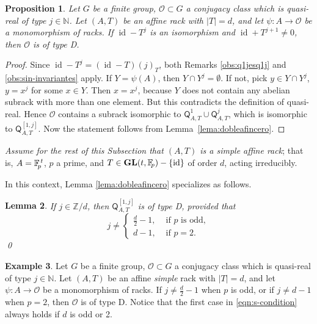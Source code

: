 \documentclass[11pt]{amsart} \textheight 22cm
\renewcommand{\^}[1]{\mbox{$^{\left( #1 \right)}$}}
\renewcommand{\_}[1]{\mbox{$_{\left( #1 \right)}$}}
\newcommand{\Z}{{\mathbb Z}}
\newcommand{\N}{{\mathbb N}}
\newcommand{\Q}{{\mathsf Q}}
\newcommand{\F}{{\mathbb F}}
\newcommand{\GL}{\mathbf{GL}}
\newcommand{\oc}{{\mathcal O}}
\theoremstyle{plain}
\newtheorem{lema}{Lemma}[section]
\newtheorem{prop}[lema]{Proposition}
\theoremstyle{definition}
\newtheorem{exa}[lema]{Example}
\theoremstyle{remark}
\newcommand\id{\operatorname{id}}
\def\pf{\begin{proof}}
\def\epf{\end{proof}}
\theoremstyle{remark}
\begin{document}
\begin{prop}\label{lema:dobleafin}
    Let $G$ be a finite group, $\oc\subset G$ a conjugacy class which is quasi-real of type
    $j\in\N$. Let $(A,T)$ be an affine rack with $\vert T\vert = d$, and let $\psi:A\to\oc$
    be a monomorphism of racks. If
    $\id-T^j$ is an isomorphism and $\id + T^{j+1} \neq 0$, then $\oc$ is of
    type D.
\end{prop}

\pf
Since $\id-T^j = (\id -T) (j)_T$, both Remarks \ref{obs:q1jesq1j}
and \ref{obs:sin-invariantes} apply. If $Y = \psi(A)$, then $Y\cap
Y^{j} = \emptyset$. If not, pick $y \in Y\cap Y^{j}$, $y = x^j$
for some $x\in Y$. Then $x = x^j$, because $Y$ does not contain
any abelian subrack with more than one element. But this
contradicts the definition of quasi-real. Hence $\oc$ contains a
subrack isomorphic to $\Q_{A,T}^1\cup\Q_{A,T}^j$, which is
isomorphic to $\Q_{A,T}^{[1,j]}$. Now the statement follows from
Lemma~\ref{lema:dobleafincero}. \epf

\emph{Assume for the rest of this Subsection that $(A,T)$ is a
simple affine rack}; that is, $A = \F_{\hspace{-2pt}p}^{\, t}$,
$p$ a prime, and $T\in \GL(t, \F_{\hspace{-2pt}p}) - \{\id\}$ of
order $d$, acting irreducibly.

In this context, Lemma \ref{lema:dobleafincero} specializes as
follows.

\begin{lema}\label{lema:dobleafin-simple}
      If $j\in \Z/d$, then $\Q_{A,T}^{[1,j]}$ is of type D, provided that
    \begin{equation}\label{eqn:s-condition}
j\neq\begin{cases} \frac{d}{2} - 1, &\text{ if $p$ is odd}, \\
d-1 , &\text{ if $p=2$}.
\end{cases}
    \end{equation}
\qed\end{lema}



\begin{exa}\label{exa:dp-tipoD}
Let $G$ be a finite group, $\oc\subset G$ a conjugacy class which
is quasi-real of type $j\in\N$. Let $(A,T)$ be an affine \emph{simple}
rack with $\vert T\vert = d$, and let $\psi:A\to\oc$ be a
monomorphism of racks. If $j\neq\frac{d}{2} - 1$ when $p$ is odd, or
if $j\neq d-1$ when $p=2$, then $\oc$ is of
type D. Notice that the first case in \eqref{eqn:s-condition} always holds if $d$ is odd or 2.
\end{exa}
\end{document}
